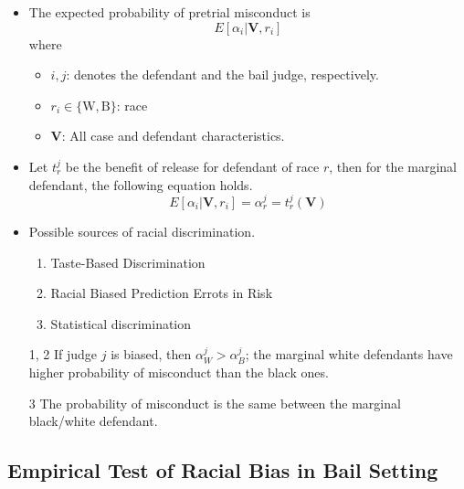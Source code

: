 \documentclass[../root]{subfiles}
\begin{document}
    \begin{itemize}
      \item The expected probability of pretrial misconduct is
      \[
      E[\alpha_i | \mathbf{V}, r_i]
      \]
      where
      \begin{itemize}
        \item $i, j$: denotes the defendant and the bail judge, respectively.
        \item $r_i \in \{\text{W}, \text{B}\}$: race
        \item $\mathbf{V}$: All case and defendant characteristics.
      \end{itemize}

      \item Let $t_r^j$ be the benefit of release for defendant of race $r$, then for the marginal defendant, the following equation holds.
      \[
      E[\alpha_i | \mathbf{V}, r_i] = \alpha_r^j = t_r^j(\mathbf{V})
      \]
      \item Possible sources of racial discrimination.
      \begin{enumerate}
        \item Taste-Based Discrimination
        \item Racial Biased Prediction Errots in Risk
        \item Statistical discrimination
      \end{enumerate}

      \item[1, 2] If judge $j$ is biased, then $\alpha_W^j > \alpha_B^j$; the marginal white defendants have higher probability of misconduct than the black ones.
      \item[3] The probability of misconduct is the same between the marginal black/white defendant.
    \end{itemize}

    \subsection{Empirical Test of Racial Bias in Bail Setting}
\end{document}
